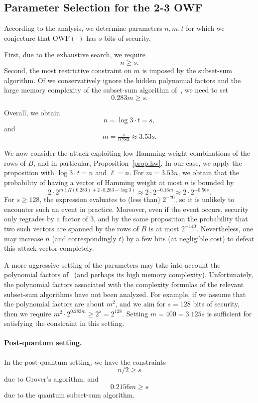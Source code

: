 \documentclass[orivec,envcountsect]{llncs}
\newcommand{\OWF}{\text{OWF}}
\begin{document}
\subsection{Parameter Selection for the 2-3 OWF}


According to the analysis, we determine parameters $n,m,t$ for which
we conjecture that $\OWF(\cdot)$ has $s$ bits of security.

First, due to the exhaustive search, we require $$n \geq s.$$
Second,
the most restrictive constraint on $m$ is imposed by the subset-sum algorithm.
Of we conservatively ignore the hidden polynomial factors and the large memory
complexity of the subset-sum algorithm of~\cite{BonnetainBSS20}, we need to set
$$0.283m \geq s.$$

Overall, we obtain
$$n = \log 3 \cdot t = s,$$
and $$m = \tfrac{s}{0.283} \approx 3.53 s.$$

We now consider the attack exploiting low Hamming weight combinations of the rows of $B$,
and in particular, Proposition~\ref{prop:hw}.
In our case, we apply the proposition with $\log 3 \cdot t = n$ and $\ell = n$.
For $m = 3.53 n$, we obtain that the probability of having a vector of Hamming weight at most $n$ is bounded by
$$2 \cdot 2^{m (H(0.283) + 2 \cdot 0.283 - \log 3)} \approx 2 \cdot 2^{-0.16m} \approx 2 \cdot 2^{- 0.56 s}.$$
For $s \geq 128$, the expression evaluates to (less than) $2^{-70}$, so it is unlikely to encounter such an event in practice.
Moreover, even if the event occurs, security only regrades by a factor of 3, and by the same
proposition the probability that two such vectors are spanned by the rows of $B$ is at most $2^{-140}$.
Nevertheless, one may increase $n$ (and correspondingly $t$)
by a few bits (at negligible cost) to defeat this attack vector completely.

A more aggressive setting of the parameters may take into account the polynomial factors of~\cite{BonnetainBSS20} (and perhaps its high memory complexity). Unfortunately, the polynomial factors associated with the complexity formulas of the relevant subset-sum algorithms have not been analyzed.
For example, if we assume that the polynomial factors are about $m^2$, and we aim for $s = 128$ bits of security, then
we require $m^2 \cdot 2^{0.283m} \geq 2^{s} = 2^{128}$. Setting $m = 400 = 3.125 s$ is sufficient for satisfying the constraint in this setting.


\paragraph{Post-quantum setting.}
In the post-quantum setting, we have the constraints
$$n/2 \geq s$$
due to Grover's algorithm, and
$$0.2156 m \geq s$$
due to the quantum subset-sum algorithm.
\end{document}
